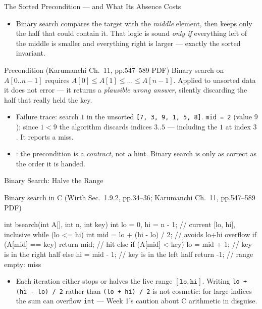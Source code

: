 \documentclass[aspectratio=169]{beamer}
\begin{document}
\begin{frame}{The Sorted Precondition --- and What Its Absence Costs}
  \begin{itemize}
    \item Binary search compares the target with the \emph{middle} element,
      then keeps only the half that could contain it. That logic is sound
      \emph{only if} everything left of the middle is smaller and everything
      right is larger --- exactly the sorted invariant.
    \end{itemize}
  \begin{alertblock}{Precondition (Karumanchi Ch.~11, pp.547--589 PDF)}
    Binary search on $A[0..n-1]$ requires $A[0] \le A[1] \le \dots \le
    A[n-1]$. Applied to unsorted data it does not error --- it returns a
    \emph{plausible wrong answer}, silently discarding the half that really
    held the key.
  \end{alertblock}
  \begin{itemize}
    \item Failure trace: search $1$ in the unsorted \texttt{[7, 3, 9, 1, 5,
      8]}. \texttt{mid = 2} (value $9$); since $1 < 9$ the algorithm discards
      indices $3..5$ --- including the $1$ at index $3$. It reports a miss.
    \item {}: the precondition is a \emph{contract}, not a hint.
      Binary search is only as correct as the order it is handed.
  \end{itemize}
\end{frame}

\begin{frame}[fragile]{Binary Search: Halve the Range}
  \footnotesize
  \begin{block}{Binary search in C (Wirth Sec.~1.9.2, pp.34--36; Karumanchi
    Ch.~11, pp.547--589 PDF)
    \cite{Wirth2004_algorithms_data_structures,Karumanchi2017_data_structures_algorithms_made_easy}}
\begin{semiverbatim}
int bsearch(int A[], int n, int key) {
  int lo = 0, hi = n - 1;               // current [lo, hi], inclusive
  while (lo <= hi) {
    int mid = lo + (hi - lo) / 2;       // avoids lo+hi overflow
    if (A[mid] == key) return mid;      // hit
    else if (A[mid] < key) lo = mid + 1; // key is in the right half
    else hi = mid - 1;                  // key is in the left half
  }
  return -1;                            // range empty: miss
}
\end{semiverbatim}
  \end{block}
  \begin{itemize}
    \item Each iteration either stops or halves the live range
      $[\texttt{lo},\texttt{hi}]$. Writing \texttt{lo + (hi - lo) / 2} rather
      than \texttt{(lo + hi) / 2} is not cosmetic: for large indices the sum
      can overflow \texttt{int} --- Week 1's caution about C arithmetic in
      disguise.
  \end{itemize}
\end{frame}
\end{document}
